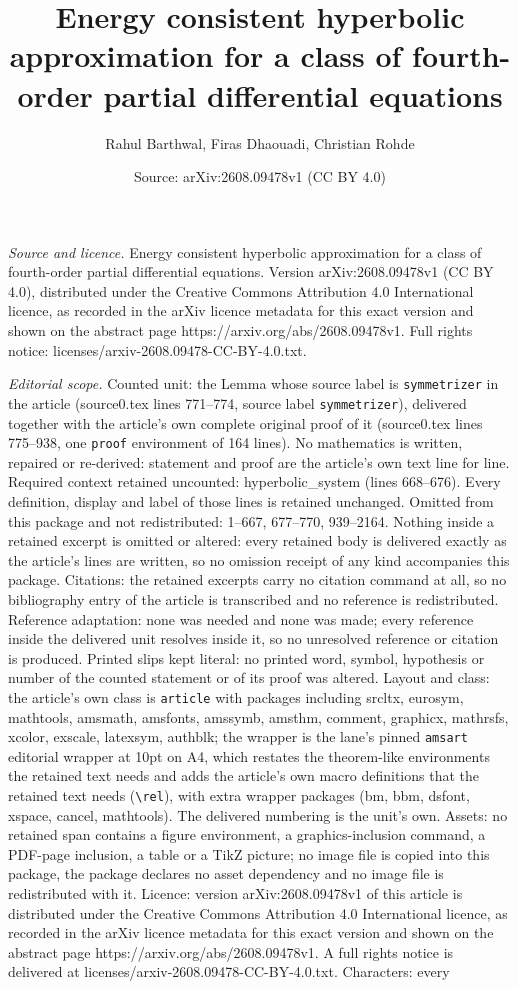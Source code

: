 \documentclass[10pt,a4paper]{amsart}
\title[Energy consistent hyperbolic approximation for a class of fo]{Energy consistent hyperbolic approximation for a class of fourth-order partial differential equations}
\author{Rahul Barthwal, Firas Dhaouadi, Christian Rohde}
\date{Source: arXiv:2608.09478v1 (CC BY 4.0)}
\begin{document}
\maketitle

\noindent\emph{Source and licence.} Energy consistent hyperbolic approximation for a class of fourth-order partial differential equations. Version arXiv:2608.09478v1 (CC BY 4.0), distributed under the Creative Commons Attribution 4.0 International licence, as recorded in the arXiv licence metadata for this exact version and shown on the abstract page https://arxiv.org/abs/2608.09478v1. Full rights notice: licenses/arxiv-2608.09478-CC-BY-4.0.txt.\par\smallskip

\noindent\textit{Editorial scope.} Counted unit: the Lemma whose source label is \texttt{symmetrizer} in the article (source0.tex lines 771--774, source label \texttt{symmetrizer}), delivered together with the article's own complete original proof of it (source0.tex lines 775--938, one \texttt{proof} environment of 164 lines). No mathematics is written, repaired or re-derived: statement and proof are the article's own text line for line. Required context retained uncounted: hyperbolic\_system (lines 668--676). Every definition, display and label of those lines is retained unchanged. Omitted from this package and not redistributed: 1--667, 677--770, 939--2164. Nothing inside a retained excerpt is omitted or altered: every retained body is delivered exactly as the article's lines are written, so no omission receipt of any kind accompanies this package. Citations: the retained excerpts carry no citation command at all, so no bibliography entry of the article is transcribed and no reference is redistributed. Reference adaptation: none was needed and none was made; every reference inside the delivered unit resolves inside it, so no unresolved reference or citation is produced. Printed slips kept literal: no printed word, symbol, hypothesis or number of the counted statement or of its proof was altered. Layout and class: the article's own class is \texttt{article} with packages including srcltx, eurosym, mathtools, amsmath, amsfonts, amssymb, amsthm, comment, graphicx, mathrsfs, xcolor, exscale, latexsym, authblk; the wrapper is the lane's pinned \texttt{amsart} editorial wrapper at 10pt on A4, which restates the theorem-like environments the retained text needs and adds the article's own macro definitions that the retained text needs (\texttt{\textbackslash rel}), with extra wrapper packages (bm, bbm, dsfont, xspace, cancel, mathtools). The delivered numbering is the unit's own. Assets: no retained span contains a figure environment, a graphics-inclusion command, a PDF-page inclusion, a table or a TikZ picture; no image file is copied into this package, the package declares no asset dependency and no image file is redistributed with it. Licence: version arXiv:2608.09478v1 of this article is distributed under the Creative Commons Attribution 4.0 International licence, as recorded in the arXiv licence metadata for this exact version and shown on the abstract page https://arxiv.org/abs/2608.09478v1. A full rights notice is delivered at licenses/arxiv-2608.09478-CC-BY-4.0.txt. Characters: every 
\end{document}
